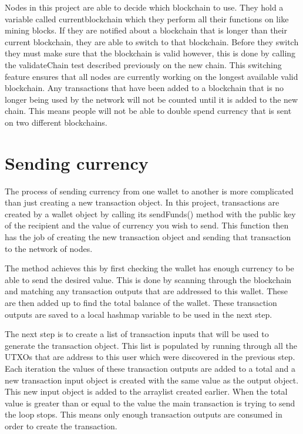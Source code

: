 \documentclass{l4proj}
\begin{document}
Nodes in this project are able to decide which blockchain to use. They hold a variable called currentblockchain
which they perform all their functions on like mining blocks. If they are notified about a blockchain that is
longer than their current blockchain, they are able to switch to that blockchain. Before they switch they must 
make sure that the blockchain is valid however, this is done by calling the validateChain test described previously
on the new chain. This switching feature ensures that all nodes are currently working on the longest available
valid blockchain. Any transactions that have been added to a blockchain that is no longer being used by the network
will not be counted until it is added to the new chain. This means people will not be able to double spend currency
that is sent on two different blockchains.

\section{Sending currency}
The process of sending currency from one wallet to another is more complicated than just creating a new transaction
object. In this project, transactions are created by a wallet object by calling its sendFunds() method with
the public key of the recipient and the value of currency you wish to send. This function then has the job of
creating the new transaction object and sending that transaction to the network of nodes.

The method achieves this by first checking the wallet has enough currency to be able to send the desired value.
This is done by scanning through the blockchain and matching any transaction outputs that are addressed to this 
wallet. These are then added up to find the total balance of the wallet. These transaction outputs are saved to a
local hashmap variable to be used in the next step.

The next step is to create a list of transaction inputs that will be used to generate the transaction object.
This list is populated by running through all the UTXOs that are address to this user which were discovered in 
the previous step. Each iteration the values of these transaction outputs are added to a total and a new 
transaction input object is created with the same value as the output object. This new input object is added
to the arraylist created earlier. When the total value is greater than or equal to the value the main transaction
is trying to send the loop stops. This means only enough transaction outputs are consumed in order to create the
transaction.
\end{document}

